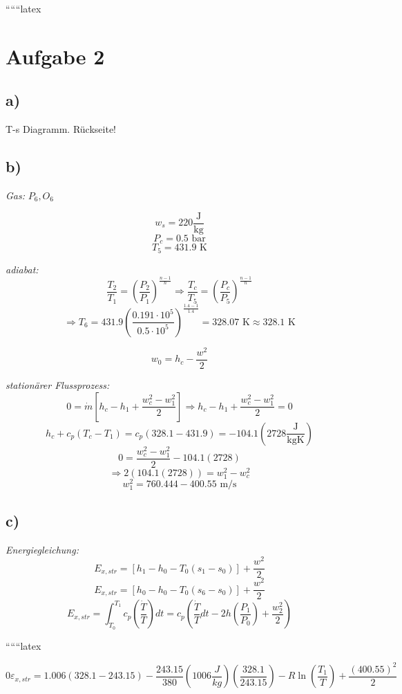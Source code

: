 
``````latex


\section*{Aufgabe 2}

\subsection*{a)}
T-s Diagramm. Rückseite!

\subsection*{b)}
\textit{Gas:} \(P_6, O_6\)

\[
w_s = 220 \frac{\text{J}}{\text{kg}}
\]
\[
P_c = 0.5 \text{ bar}
\]
\[
T_5 = 431.9 \text{ K}
\]

\textit{adiabat:}
\[
\frac{T_2}{T_1} = \left( \frac{P_2}{P_1} \right)^{\frac{n-1}{n}} \Rightarrow \frac{T_c}{T_5} = \left( \frac{P_c}{P_5} \right)^{\frac{n-1}{n}}
\]
\[
\Rightarrow T_6 = 431.9 \left( \frac{0.191 \cdot 10^5}{0.5 \cdot 10^5} \right)^{\frac{1.4-1}{1.4}} = 328.07 \text{ K} \approx 328.1 \text{ K}
\]

\[
w_0 = h_c - \frac{w^2}{2}
\]

\textit{stationärer Flussprozess:}
\[
0 = \dot{m} \left[ h_c - h_1 + \frac{w_c^2 - w_1^2}{2} \right] \Rightarrow h_c - h_1 + \frac{w_c^2 - w_1^2}{2} = 0
\]
\[
h_c + c_p \left( T_c - T_1 \right) = c_p \left( 328.1 - 431.9 \right) = -104.1 (2728 \frac{\text{J}}{\text{kgK}})
\]
\[
0 = \frac{w_c^2 - w_1^2}{2} - 104.1 (2728)
\]
\[
\Rightarrow 2 (104.1 (2728)) = w_1^2 - w_c^2
\]
\[
w_1^2 = 760.444 - 400.55 \text{ m/s}
\]

\subsection*{c)}
\textit{Energiegleichung:}
\[
E_{x,str} = \left[ h_1 - h_0 - T_0 (s_1 - s_0) \right] + \frac{w^2}{2}
\]
\[
E_{x,str} = \left[ h_0 - h_0 - T_0 (s_6 - s_0) \right] + \frac{w^2}{2}
\]
\[
E_{x,str} = \int_{T_0}^{T_1} c_p \left( \frac{\dot{T}}{T} \right) dt = c_p \left( \frac{\dot{T}}{T} dt - 2h \left( \frac{P_1}{P_0} \right) + \frac{w_2^2}{2} \right)
\]

``````latex


\[
0 \varepsilon_{x,str} = 1.006 (328.1 - 243.15) - \frac{243.15}{380} (1006 \frac{J}{kg}) \left( \frac{328.1}{243.15} \right) - R \ln \left( \frac{T_1}{T} \right) + \frac{(400.55)^2}{2}
\]


